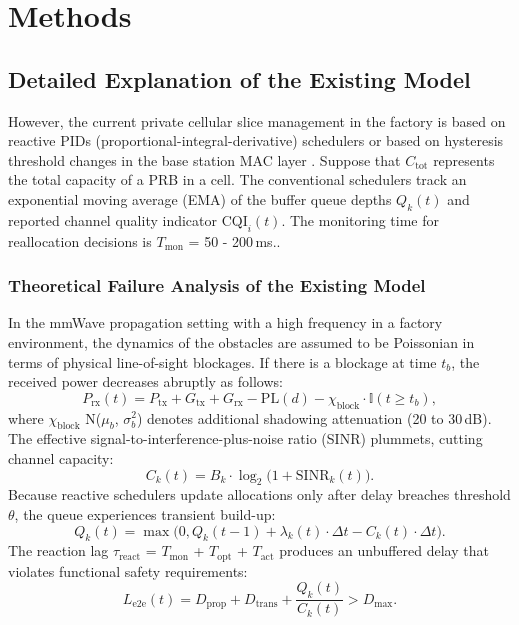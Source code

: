 \documentclass[twocolumn,10pt,twoside]{article}
\begin{document}
\section{Methods}
\subsection{Detailed Explanation of the Existing Model}
However, the current private cellular slice management in the factory is based on reactive PIDs (proportional-integral-derivative) schedulers or based on hysteresis threshold changes in the base station MAC layer \cite{qazzaz2026oreo, yungaicela2026rslaq}. Suppose that $C_{\text{tot}}$ represents the total capacity of a PRB in a cell. The conventional schedulers track an exponential moving average (EMA) of the buffer queue depths $Q_k(t)$ and reported channel quality indicator $\text{CQI}_i(t)$. The monitoring time for reallocation decisions is $T_{\text{mon}}$ = 50 - 200\,ms..

\subsubsection{Theoretical Failure Analysis of the Existing Model}
In the mmWave propagation setting with a high frequency in a factory environment, the dynamics of the obstacles are assumed to be Poissonian in terms of physical line-of-sight blockages. If there is a blockage at time $t_b$, the received power decreases abruptly as follows:
\begin{equation}
P_{\text{rx}}(t) = P_{\text{tx}} + G_{\text{tx}} + G_{\text{rx}} - \text{PL}(d) - \chi_{\text{block}} \cdot \mathbb{I}(t \ge t_b),
\label{eq:received_power}
\end{equation}
where $\chi_{\text{block}}$   N($\mu_b$, $\sigma_b^2$) denotes additional shadowing attenuation (20 to 30\,dB). The effective signal-to-interference-plus-noise ratio (SINR) plummets, cutting channel capacity:
\begin{equation}
C_k(t) = B_k \cdot \log_2\big(1 + \text{SINR}_k(t)\big).
\label{eq:channel_capacity}
\end{equation}
Because reactive schedulers update allocations only after delay breaches threshold $\theta$, the queue experiences transient build-up:
\begin{equation}
Q_k(t) = \max\big(0, Q_k(t-1) + \lambda_k(t) \cdot \Delta t - C_k(t) \cdot \Delta t\big).
\label{eq:queue_dynamics}
\end{equation}
The reaction lag $\tau_{\text{react}}$ = $T_{\text{mon}}$ + $T_{\text{opt}}$ + $T_{\text{act}}$ produces an unbuffered delay that violates functional safety requirements:
\begin{equation}
L_{\text{e2e}}(t) = D_{\text{prop}} + D_{\text{trans}} + \frac{Q_k(t)}{C_k(t)} > D_{\max}.
\label{eq:latency_violation}
\end{equation}
\end{document}
